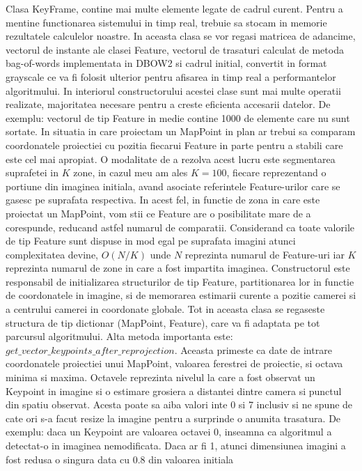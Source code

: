 \documentclass[12pt,a4paper]{report}
\begin{document}
Clasa KeyFrame, contine mai multe elemente legate de cadrul curent. Pentru a mentine 
functionarea sistemului in timp real, trebuie sa stocam in memorie rezultatele calculelor noastre.
In aceasta clasa se vor regasi matricea de adancime, vectorul de instante ale clasei Feature,
vectorul de trasaturi calculat de metoda bag-of-words implementata in DBOW2 si cadrul initial, 
convertit in format grayscale ce va fi folosit ulterior pentru afisarea in timp real a performantelor
algoritmului. In interiorul constructorului acestei clase sunt mai multe operatii realizate,
majoritatea necesare pentru a creste eficienta accesarii datelor. De exemplu: vectorul de tip Feature
in medie contine 1000 de elemente care nu sunt sortate. In situatia in care proiectam un MapPoint in 
plan ar trebui sa comparam coordonatele proiectiei cu pozitia fiecarui Feature in parte pentru a 
stabili care este cel mai apropiat. O modalitate de a rezolva acest lucru este segmentarea suprafetei
in \(K\) zone, in cazul meu am ales $ K = 100$, fiecare reprezentand o portiune din imaginea initiala,
avand asociate referintele Feature-urilor care se gasesc pe suprafata respectiva. In acest fel,
in functie de zona in care este proiectat un MapPoint, vom stii ce Feature are o posibilitate
mare de a corespunde, reducand astfel numarul de comparatii. 
Considerand ca toate valorile de tip Feature sunt dispuse in mod egal pe suprafata imagini atunci
complexitatea devine, $ O(N / K) $ unde \(N\) reprezinta numarul de Feature-uri iar \(K\) reprezinta
numarul de zone in care a fost impartita imaginea. Constructorul este responsabil de initializarea
structurilor de tip Feature, partitionarea lor in functie de coordonatele in imagine, si de memorarea
estimarii curente a pozitie camerei si a centrului camerei in coordonate globale. Tot in aceasta 
clasa se regaseste structura de tip dictionar (MapPoint, Feature), care va fi adaptata pe tot 
parcursul algoritmului. Alta metoda importanta este: $ get\_vector\_keypoints\_after\_reprojection $.
Aceasta primeste ca date de intrare coordonatele proiectiei unui MapPoint, valoarea ferestrei 
de proiectie, si octava minima si maxima. Octavele reprezinta nivelul la care a fost observat 
un Keypoint in imagine si o estimare grosiera a distantei dintre camera si punctul din spatiu 
observat. Acesta poate sa aiba valori inte 0 si 7 inclusiv si ne spune de cate ori 
s-a facut resize la imagine pentru a surprinde o anumita trasatura. De exemplu: daca 
un Keypoint are valoarea octavei 0, inseamna ca algoritmul a detectat-o in imaginea nemodificata.
Daca ar fi 1, atunci dimensiunea imagini a fost redusa o singura data cu 0.8 din valoarea initiala 
\end{document}
